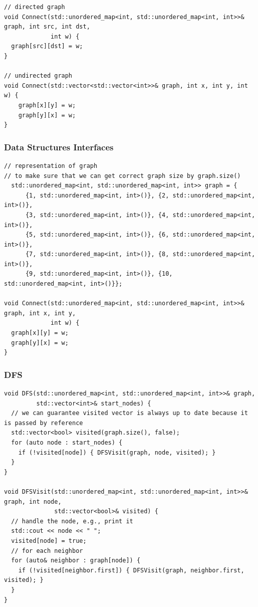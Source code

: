 \begin{lstlisting}
// directed graph
void Connect(std::unordered_map<int, std::unordered_map<int, int>>& graph, int src, int dst,
             int w) {
  graph[src][dst] = w;
}

// undirected graph
void Connect(std::vector<std::vector<int>>& graph, int x, int y, int w) {
	graph[x][y] = w;
	graph[y][x] = w;
}
\end{lstlisting}
\subsubsection{Data Structures Interfaces}
\begin{lstlisting}
// representation of graph
// to make sure that we can get correct graph size by graph.size()
  std::unordered_map<int, std::unordered_map<int, int>> graph = {
      {1, std::unordered_map<int, int>()}, {2, std::unordered_map<int, int>()},
      {3, std::unordered_map<int, int>()}, {4, std::unordered_map<int, int>()},
      {5, std::unordered_map<int, int>()}, {6, std::unordered_map<int, int>()},
      {7, std::unordered_map<int, int>()}, {8, std::unordered_map<int, int>()},
      {9, std::unordered_map<int, int>()}, {10, std::unordered_map<int, int>()}};
	
void Connect(std::unordered_map<int, std::unordered_map<int, int>>& graph, int x, int y,
             int w) {
  graph[x][y] = w;
  graph[y][x] = w;
}
\end{lstlisting}
\subsubsection{DFS}
\begin{lstlisting}
void DFS(std::unordered_map<int, std::unordered_map<int, int>>& graph,
         std::vector<int>& start_nodes) {
  // we can guarantee visited vector is always up to date because it is passed by reference
  std::vector<bool> visited(graph.size(), false);
  for (auto node : start_nodes) {
    if (!visited[node]) { DFSVisit(graph, node, visited); }
  }
}

void DFSVisit(std::unordered_map<int, std::unordered_map<int, int>>& graph, int node,
              std::vector<bool>& visited) {
  // handle the node, e.g., print it
  std::cout << node << " ";
  visited[node] = true;
  // for each neighbor
  for (auto& neighbor : graph[node]) {
    if (!visited[neighbor.first]) { DFSVisit(graph, neighbor.first, visited); }
  }
}
\end{lstlisting}
